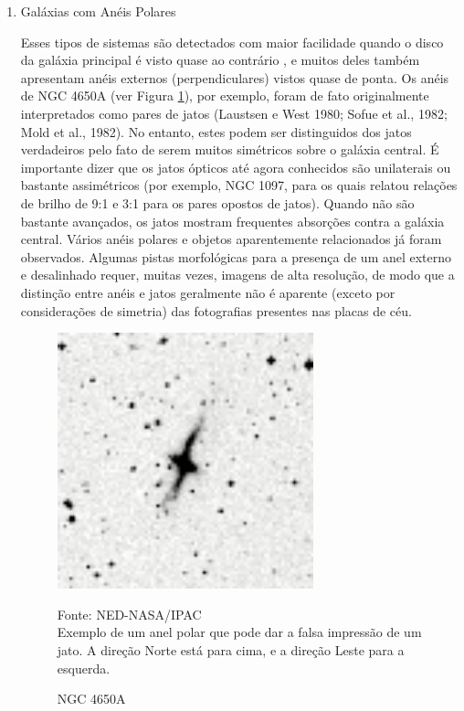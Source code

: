\begin{enumerate}
\item Galáxias com Anéis Polares

Esses tipos de sistemas são detectados com maior facilidade quando o disco da galáxia principal é visto quase ao contrário \cite{schweizer1983colliding}, e muitos deles também apresentam anéis externos (perpendiculares) vistos quase de ponta. Os anéis de NGC 4650A (ver Figura \ref{fig:NGC-4650A}), por exemplo, foram de fato originalmente interpretados como pares de jatos (Laustsen e West 1980; Sofue et al., 1982; Mold et al., 1982). No entanto, estes podem ser distinguidos dos jatos verdadeiros pelo fato de serem muitos simétricos sobre o galáxia central. É importante dizer que os jatos ópticos até agora conhecidos são unilaterais ou bastante assimétricos (por exemplo, NGC 1097, para os quais \cite{lorre1978enhancement} relatou relações de brilho de 9:1 e 3:1 para os pares opostos de jatos). Quando não são bastante avançados, os jatos mostram frequentes absorções contra a galáxia central. Vários anéis polares e objetos aparentemente relacionados já foram observados. Algumas pistas morfológicas para a presença de um anel externo e desalinhado requer, muitas vezes, imagens de alta resolução, de modo que a distinção entre anéis e jatos geralmente não é aparente (exceto por considerações de simetria) das fotografias presentes nas placas de céu.

\begin{figure}[H]
	\centering	
    \caption{NGC 4650A}
    \includegraphics[width=0.7\textwidth]{figuras/ngc4650A.jpg}
   	\begin{center}
        \normalsize Fonte: NED-NASA/IPAC \\Exemplo de um anel polar que pode dar a falsa impressão de um jato. A direção Norte está para cima, e a direção Leste para a esquerda.
    \end{center}
	\label{fig:NGC-4650A}
\end{figure}


\end{enumerate}
